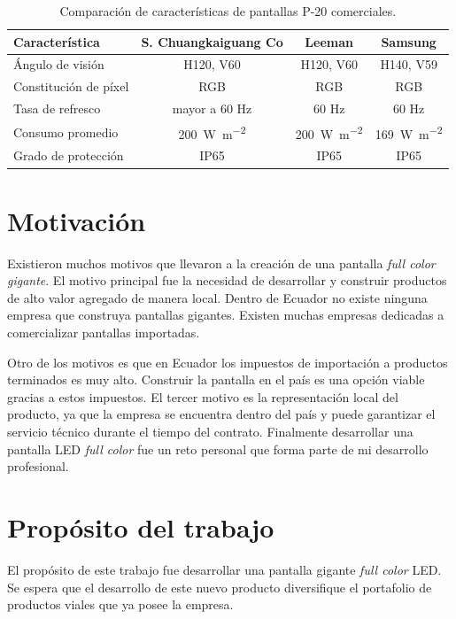 \begin{table}[h]
\centering
\caption[Comparación entre pantallas P-20]{Comparación de características de pantallas P-20 comerciales.}
\begin{tabular}{l c c c}
\toprule
\textbf{Característica} & \textbf{S. Chuangkaiguang Co \citep{TABLAREF1}} & \textbf{Leeman \citep{TABLAREF2}} & \textbf{Samsung \citep{TABLAREF3}} \\
\midrule 

Ángulo de visión        & H120, V60 & H120, V60 & H140, V59 \\
Constitución de píxel   & RGB & RGB & RGB \\
Tasa de refresco        & mayor a 60 Hz & 60 Hz & 60 Hz \\
Consumo promedio        & \SI{200}{\watt\per\meter\squared} & \SI{200}{\watt\per\meter\squared} & \SI{169}{\watt\per\meter\squared} \\
Grado de protección     & IP65 & IP65 & IP65 \\

\bottomrule
\hline
\end{tabular}
\label{tab:comercial}
\end{table}





\section{Motivación}
Existieron muchos motivos que llevaron a la creación de una pantalla \textit{full color gigante}. El motivo principal fue la necesidad de desarrollar y construir productos de alto valor agregado de manera local. Dentro de Ecuador no existe ninguna empresa que construya pantallas gigantes. Existen muchas empresas dedicadas a comercializar pantallas importadas. 

Otro de los motivos es que en Ecuador los impuestos de importación a productos terminados es muy alto. Construir la pantalla en el país es una opción viable gracias a estos impuestos. El tercer motivo es la representación local del producto, ya que la empresa se encuentra dentro del país y puede garantizar el servicio técnico durante el tiempo del contrato. Finalmente desarrollar una pantalla LED \textit{full color} fue un reto personal que forma parte de mi desarrollo profesional. 



\section{Propósito del trabajo}
El propósito de este trabajo fue desarrollar una pantalla gigante \textit{full color} LED. Se espera que el desarrollo de este nuevo producto diversifique el portafolio de productos viales que ya posee la empresa.

